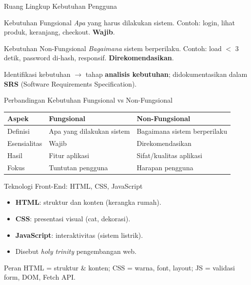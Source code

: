 \documentclass[handout]{beamer}
\begin{document}
\begin{frame}{Ruang Lingkup Kebutuhan Pengguna}
	\begin{block}{Kebutuhan Fungsional}
		\textit{Apa} yang harus dilakukan sistem. Contoh: login, lihat produk, keranjang, checkout. \textbf{Wajib}.
	\end{block}
	\begin{block}{Kebutuhan Non-Fungsional}
		\textit{Bagaimana} sistem berperilaku. Contoh: load $<$ 3 detik, password di-hash, responsif. \textbf{Direkomendasikan}.
	\end{block}
	Identifikasi kebutuhan $\to$ tahap \textbf{analisis kebutuhan}; didokumentasikan dalam \textbf{SRS} (Software Requirements Specification).
\end{frame}

\begin{frame}{Perbandingan Kebutuhan Fungsional vs Non-Fungsional}
	\small
	\begin{tabular}{|l|l|l|}
		\hline
		\textbf{Aspek} & \textbf{Fungsional} & \textbf{Non-Fungsional} \\
		\hline
		Definisi & Apa yang dilakukan sistem & Bagaimana sistem berperilaku \\
		\hline
		Esensialitas & Wajib & Direkomendasikan \\
		\hline
		Hasil & Fitur aplikasi & Sifat/kualitas aplikasi \\
		\hline
		Fokus & Tuntutan pengguna & Harapan pengguna \\
		\hline
	\end{tabular}
\end{frame}

\begin{frame}{Teknologi Front-End: HTML, CSS, JavaScript}
	\begin{itemize}
		\item \textbf{HTML}: struktur dan konten (kerangka rumah).
		\item \textbf{CSS}: presentasi visual (cat, dekorasi).
		\item \textbf{JavaScript}: interaktivitas (sistem listrik).
		\item Disebut \textit{holy trinity} pengembangan web.
	\end{itemize}
	\begin{block}{Peran}
		HTML = struktur \& konten; CSS = warna, font, layout; JS = validasi form, DOM, Fetch API.
	\end{block}
\end{frame}
\end{document}
